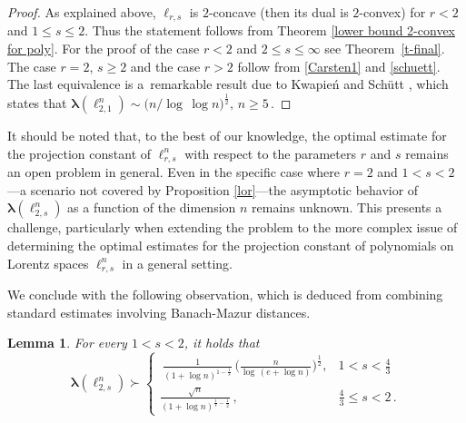 \documentclass[12pt]{amsart}
\numberwithin{subsection}{section}
\newtheorem{lemma}[theorem]{Lemma}
\theoremstyle{definition}
\theoremstyle{remark}
\begin{document}
\begin{proof}
As explained above,  $\ell_{r,s}$ is $2$-concave (then its dual is $2$-convex) for $r < 2$ and $1 \leq s \leq 2$. Thus the
statement follows from Theorem \ref{lower bound 2-convex for poly}. For the proof of the case  $r < 2$ and $2 \leq s \leq \infty$
see Theorem~\ref{t-final}. The case $r=2$, $s\ge2$ and the case $r>2$ follow from  \eqref{Carsten1} and \eqref{schuett}.
The last equivalence is a~remarkable result due to Kwapie\'n and Sch\"{u}tt \cite{schuettkwapien}, which states that
$
\boldsymbol{\lambda}(\ell^n_{2,1})\sim \big(n/\log\,\log n\big)^{\frac12}, \, n\geq 5\,.
$
\end{proof}

It should be noted that, to the best of our knowledge, the optimal estimate for the projection constant of $\ell_{r,s}^n$ with respect to the parameters $r$ and $s$ remains an open problem in general.  Even in the specific case where $r = 2$ and $1 < s < 2$—a scenario not covered by Proposition \ref{lor}—the asymptotic behavior of $\boldsymbol{\lambda}(\ell_{2,s}^n)$ as a function of the dimension $n$ remains unknown. This presents a challenge, particularly when extending the problem to the more complex issue of determining the optimal estimates for the projection constant of polynomials on Lorentz spaces $\ell_{r,s}^n$ in a general setting.

We conclude with the following observation, which is deduced from combining standard estimates involving Banach-Mazur distances.


\begin{lemma}
For every $1<s<2$, it holds that
\[
\boldsymbol{\lambda}(\ell^n_{2,s})\succ
\begin{cases} \
\frac{1}{(1 + \log n)^{1 - \frac{1}{s}}}\,
\Big({\frac{n}{\log \,(e + \log n)}}\Big)^{\frac12},& 1<s <\frac{4}{3} \\[2mm]
\frac{\sqrt{n}}{(1+\log n)^{\frac{1}{s}-\frac{1}{2}}}\,, & \frac{4}{3} \leq s <2\,.
\end{cases}
\]
\end{lemma}
\end{document}
